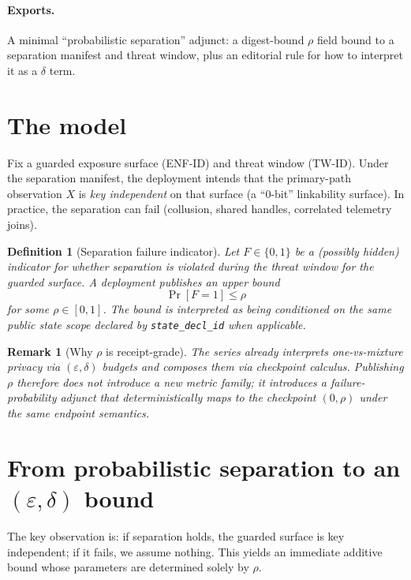 \documentclass[11pt]{article}
\newtheorem{definition}{Definition}
\newtheorem{remark}{Remark}
\begin{document}
\paragraph{Exports.}
A minimal ``probabilistic separation'' adjunct: a digest-bound $\rho$ field bound to a separation manifest and threat window, plus an editorial rule for how to interpret it as a $\delta$ term.

\section{The model}
Fix a guarded exposure surface (ENF-ID) and threat window (TW-ID).\cite{series:traceifaces,series:threatwindows}
Under the separation manifest, the deployment intends that the primary-path observation $X$ is \emph{key independent} on that surface (a ``0-bit'' linkability surface).
In practice, the separation can fail (collusion, shared handles, correlated telemetry joins).

\begin{definition}[Separation failure indicator]
Let $F\in\{0,1\}$ be a (possibly hidden) indicator for whether separation is violated during the threat window for the guarded surface.
A deployment publishes an upper bound
\[\Pr[F=1] \le \rho\]
for some $\rho\in[0,1]$.
The bound is interpreted as being conditioned on the same public state scope declared by \texttt{state\_decl\_id} when applicable.\cite{series:planstateequiv}
\end{definition}

\begin{remark}[Why $\rho$ is receipt-grade]
The series already interprets one-vs-mixture privacy via $(\varepsilon,\delta)$ budgets and composes them via checkpoint calculus.\cite{series:oddsinflation}
Publishing $\rho$ therefore does not introduce a new metric family; it introduces a \emph{failure-probability adjunct} that deterministically maps to the checkpoint $(0,\rho)$ under the same endpoint semantics.
\end{remark}

\section{From probabilistic separation to an $(\varepsilon,\delta)$ bound}
The key observation is: if separation holds, the guarded surface is key independent; if it fails, we assume nothing.
This yields an immediate additive bound whose parameters are determined solely by $\rho$.
\end{document}
